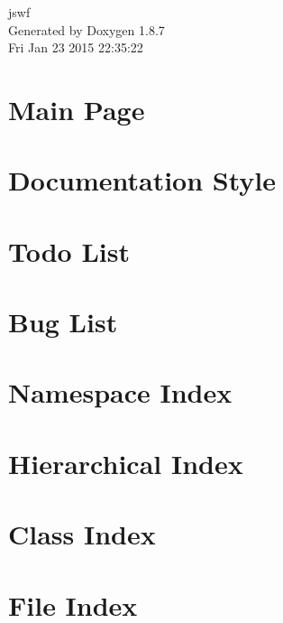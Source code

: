 \documentclass[twoside]{book}
\newcommand{\+}{\discretionary{\mbox{\scriptsize$\hookleftarrow$}}{}{}}
\newcommand{\clearemptydoublepage}{%
  \newpage{\pagestyle{empty}\cleardoublepage}%
}
\begin{document}
\hypersetup{pageanchor=false,
             bookmarks=true,
             bookmarksnumbered=true,
             pdfencoding=unicode
            }
\begin{titlepage}
\vspace*{7cm}
\begin{center}%
{\Large jswf }\\
\vspace*{1cm}
{\large Generated by Doxygen 1.8.7}\\
\vspace*{0.5cm}
{\small Fri Jan 23 2015 22:35:22}\\
\end{center}
\end{titlepage}
\clearemptydoublepage
\tableofcontents
\clearemptydoublepage
{}
\hypersetup{pageanchor=true}

\chapter{Main Page}
\label{index}\hypertarget{index}{}
\chapter{Documentation Style}
\label{md_jswf_documentation_doc-style}
\hypertarget{md_jswf_documentation_doc-style}{}

\chapter{Todo List}
\label{todo}
\hypertarget{todo}{}

\chapter{Bug List}
\label{bug}
\hypertarget{bug}{}

\chapter{Namespace Index}

\chapter{Hierarchical Index}

\chapter{Class Index}

\chapter{File Index}

\end{document}
